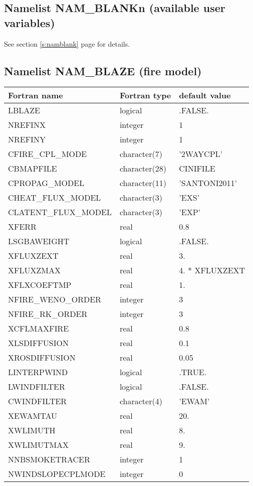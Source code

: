 \subsection{Namelist NAM\_BLANKn (available user variables)}
See section \ref{s:namblank} page \pageref{s:namblank} for details.

\subsection{Namelist NAM\_BLAZE (fire model)}

\begin{center}
\begin{tabular} {|l|l|l|}
\hline
Fortran name & Fortran type & default value \\
\hline

LBLAZE					&	logical 		& .FALSE. \\
NREFINX 					&	integer			& 1 \\
NREFINY 					&	integer			& 1 \\
CFIRE\_CPL\_MODE 		& 	character(7)	& '2WAYCPL' \\
CBMAPFILE 				&   character(28)	& CINIFILE \\
CPROPAG\_MODEL			&	character(11)	& 'SANTONI2011' \\

CHEAT\_FLUX\_MODEL		&   character(3)	& 'EXS' \\
CLATENT\_FLUX\_MODEL	& 	character(3)	& 'EXP' \\
XFERR					&	real			& 0.8 \\
LSGBAWEIGHT 				&	logical 		& .FALSE. \\
XFLUXZEXT				&	real			& 3. \\
XFLUXZMAX 				&	real			& 4. * XFLUXZEXT \\  
XFLXCOEFTMP				&	real			& 1. \\ 

NFIRE\_WENO\_ORDER 		&	integer			& 3 \\
NFIRE\_RK\_ORDER 		& 	integer			& 3 \\
XCFLMAXFIRE 				& 	real			& 0.8 \\
XLSDIFFUSION 			&	real			& 0.1 \\
XROSDIFFUSION 			&	real			& 0.05 \\

LINTERPWIND 				& 	logical 		& .TRUE. \\
LWINDFILTER 				& 	logical 		& .FALSE. \\
CWINDFILTER				&	character(4)	& 'EWAM' \\
XEWAMTAU					&	real			& 20. \\
XWLIMUTH 				&	real			& 8. \\
XWLIMUTMAX				&	real			& 9. \\

NNBSMOKETRACER			&	integer			& 1 \\
NWINDSLOPECPLMODE		&	integer			& 0 \\
\hline
\end{tabular}
\end{center}
